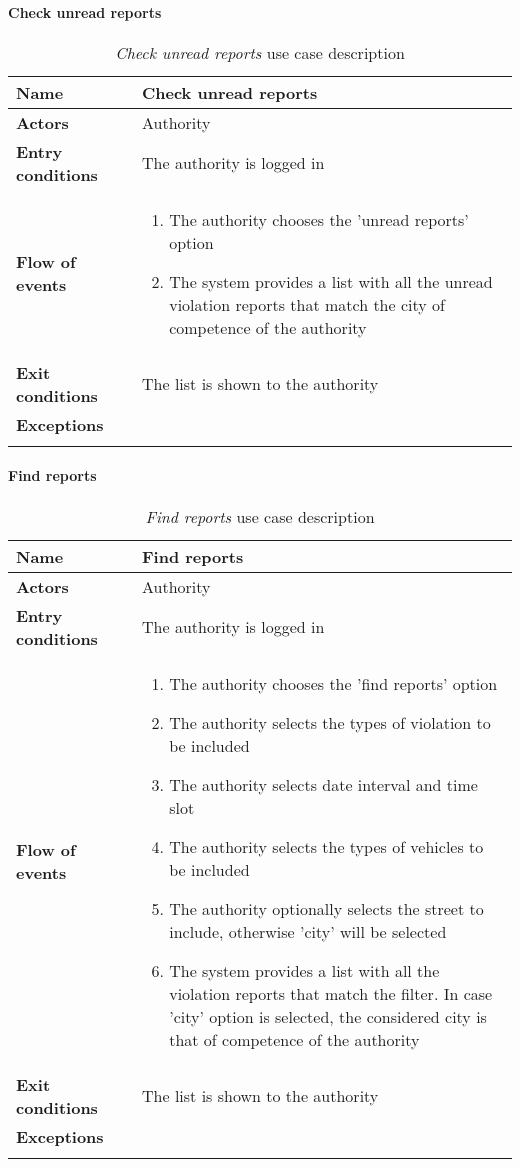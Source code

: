 		\paragraph{Check unread reports}
		\begin{longtable}{p{0.25\linewidth}p{0.75\linewidth}}
			\toprule
			\textbf{Name} & \textbf{Check unread reports} \\
			\midrule
			\textbf{Actors} & Authority\\
			\midrule
			\textbf{Entry conditions} & The authority is logged in \\
			\midrule
			\textbf{Flow of events} & 
			\begin{enumerate}
				\item The authority chooses the 'unread reports' option
				\item The system provides a list with all the unread violation reports that match the city of competence of the authority
			\end{enumerate} \\
			\midrule
			\textbf{Exit conditions} & The list is shown to the authority\\
			\midrule
			\textbf{Exceptions} &  \\
			\bottomrule
			\caption{\emph{Check unread reports} use case description}
		\end{longtable}
	
		\paragraph{Find reports}
	\begin{longtable}{p{0.25\linewidth}p{0.75\linewidth}}
		\toprule
		\textbf{Name} & \textbf{Find reports} \\
		\midrule
		\textbf{Actors} & Authority\\
		\midrule
		\textbf{Entry conditions} & The authority is logged in \\
		\midrule
		\textbf{Flow of events} & 
		\begin{enumerate}
			\item The authority chooses the 'find reports' option
			\item The authority selects the types of violation to be included
			\item The authority selects date interval and time slot
			\item The authority selects the types of vehicles to be included
			\item The authority optionally selects the street to include, otherwise 'city' will be selected
			\item The system provides a list with all the violation reports that match the filter. In case 'city' option is selected, the considered city is that of competence of the authority
		\end{enumerate} \\
		\midrule
		\textbf{Exit conditions} & The list is shown to the authority\\
		\midrule
		\textbf{Exceptions} &  \\
		\bottomrule
		\caption{\emph{Find reports} use case description}
	\end{longtable}
	

